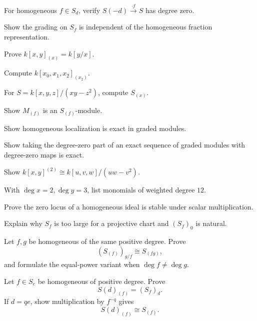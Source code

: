 \begin{exercise}\label{exr:vi34-13}
For homogeneous \(f\in S_d\), verify \(S(-d)\xrightarrow{\cdot f}S\) has degree zero.
\end{exercise}
\begin{exercise}\label{exr:vi34-14}
Show the grading on \(S_f\) is independent of the homogeneous fraction representation.
\end{exercise}
\begin{exercise}[Compute \(S_{(x)}\)]\label{exr:vi34-15}
Prove \(k[x,y]_{(x)}=k[y/x]\).
\end{exercise}
\begin{exercise}\label{exr:vi34-16}
Compute \(k[x_0,x_1,x_2]_{(x_2)}\).
\end{exercise}
\begin{exercise}\label{exr:vi34-17}
For \(S=k[x,y,z]/(xy-z^2)\), compute \(S_{(x)}\).
\end{exercise}
\begin{exercise}\label{exr:vi34-18}
Show \(M_{(f)}\) is an \(S_{(f)}\)-module.
\end{exercise}
\begin{exercise}\label{exr:vi34-19}
Show homogeneous localization is exact in graded modules.
\end{exercise}
\begin{exercise}\label{exr:vi34-20}
Show taking the degree-zero part of an exact sequence of graded modules with degree-zero maps is exact.
\end{exercise}
\begin{exercise}\label{exr:vi34-21}
Show \(k[x,y]^{(2)}\cong k[u,v,w]/(uw-v^2)\).
\end{exercise}
\begin{exercise}\label{exr:vi34-22}
With \(\deg x=2,\deg y=3\), list monomials of weighted degree \(12\).
\end{exercise}
\begin{exercise}\label{exr:vi34-23}
Prove the zero locus of a homogeneous ideal is stable under scalar multiplication.
\end{exercise}
\begin{exercise}\label{exr:vi34-24}
Explain why \(S_f\) is too large for a projective chart and \((S_f)_0\) is natural.
\end{exercise}
\begin{exercise}\label{exr:vi34-25}
Let \(f,g\) be homogeneous of the same positive degree. Prove
\[
(S_{(f)})_{g/f}\cong S_{(fg)},
\]
and formulate the equal-power variant when \(\deg f\neq\deg g\).
\end{exercise}
\begin{exercise}\label{exr:vi34-26}
Let \(f\in S_e\) be homogeneous of positive degree. Prove
\[
S(d)_{(f)}=(S_f)_d.
\]
If \(d=qe\), show multiplication by \(f^{-q}\) gives
\[
S(d)_{(f)}\cong S_{(f)}.
\]
\end{exercise}
